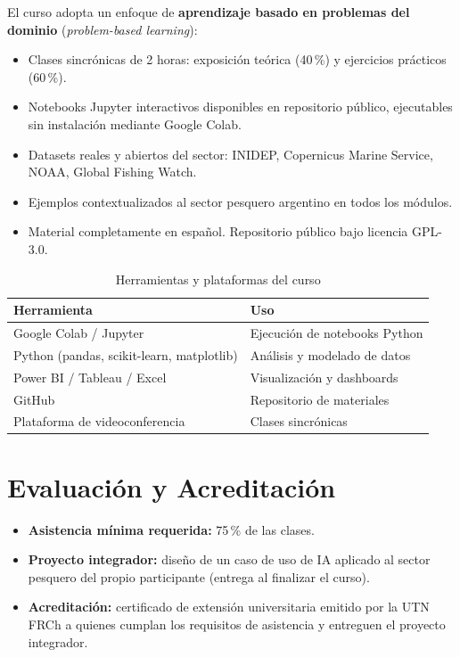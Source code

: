 \documentclass[12pt,a4paper]{article}
\begin{document}
El curso adopta un enfoque de \textbf{aprendizaje basado en problemas del dominio} (\textit{problem-based learning}):

\begin{itemize}
  \item Clases sincrónicas de 2 horas: exposición teórica (40\,\%) y ejercicios prácticos (60\,\%).
  \item Notebooks Jupyter interactivos disponibles en repositorio público, ejecutables sin instalación mediante Google Colab.
  \item Datasets reales y abiertos del sector: INIDEP, Copernicus Marine Service, NOAA, Global Fishing Watch.
  \item Ejemplos contextualizados al sector pesquero argentino en todos los módulos.
  \item Material completamente en español. Repositorio público bajo licencia GPL-3.0.
\end{itemize}

\begin{table}[H]
  \centering
  \caption{Herramientas y plataformas del curso}
  \begin{tabular}{@{}ll@{}}
    \toprule
    \textbf{Herramienta} & \textbf{Uso} \\
    \midrule
    Google Colab / Jupyter & Ejecución de notebooks Python \\
    Python (pandas, scikit-learn, matplotlib) & Análisis y modelado de datos \\
    Power BI / Tableau / Excel & Visualización y dashboards \\
    GitHub & Repositorio de materiales \\
    Plataforma de videoconferencia & Clases sincrónicas \\
    \bottomrule
  \end{tabular}
\end{table}

\section{Evaluación y Acreditación}

\begin{itemize}
  \item \textbf{Asistencia mínima requerida:} 75\,\% de las clases.
  \item \textbf{Proyecto integrador:} diseño de un caso de uso de IA aplicado al sector pesquero del propio participante (entrega al finalizar el curso).
  \item \textbf{Acreditación:} certificado de extensión universitaria emitido por la UTN FRCh a quienes cumplan los requisitos de asistencia y entreguen el proyecto integrador.
\end{itemize}
\end{document}
